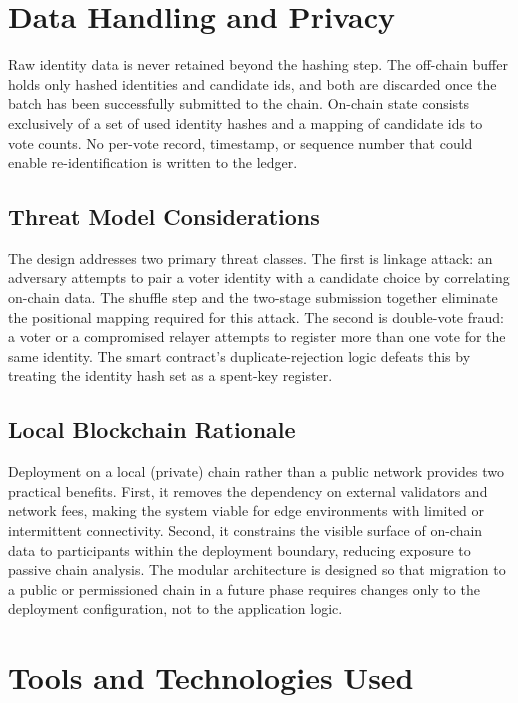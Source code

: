 \section{Data Handling and Privacy}

Raw identity data is never retained beyond the hashing step. The off-chain buffer holds only hashed identities and candidate \glspl{id}, and both are discarded once the batch has been successfully submitted to the chain. On-chain state consists exclusively of a set of used identity hashes and a mapping of candidate \glspl{id} to vote counts. No per-vote record, timestamp, or sequence number that could enable re-identification is written to the ledger.

\subsection{Threat Model Considerations}

The design addresses two primary threat classes. The first is linkage attack: an adversary attempts to pair a voter identity with a candidate choice by correlating on-chain data. The shuffle step and the two-stage submission together eliminate the positional mapping required for this attack. The second is double-vote fraud: a voter or a compromised relayer attempts to register more than one vote for the same identity. The smart contract's duplicate-rejection logic defeats this by treating the identity hash set as a spent-key register.

\subsection{Local Blockchain Rationale}

Deployment on a local (private) chain rather than a public network provides two practical benefits. First, it removes the dependency on external validators and network fees, making the system viable for edge environments with limited or intermittent connectivity. Second, it constrains the visible surface of on-chain data to participants within the deployment boundary, reducing exposure to passive chain analysis. The modular architecture is designed so that migration to a public or permissioned chain in a future phase requires changes only to the deployment configuration, not to the application logic.

\section{Tools and Technologies Used}

